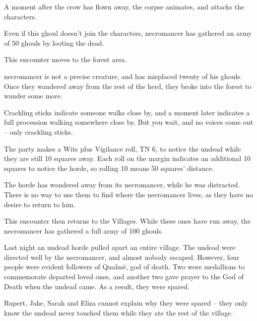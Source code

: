 \begin{multicols}{2}
A moment after the crow has flown away, the corpse animates, and attacks the characters.


Even if this ghoul doesn't join the characters, \gls{necromancer} has gathered an army of 50 ghouls by looting the dead.

This encounter moves to the forest area.


\Gls{necromancer} is not a precise creature, and has misplaced twenty of his ghouls.
Once they wandered away from the rest of the herd, they broke into the forest to wander some more.

\begin{boxtext}

	Crackling sticks indicate someone walks close by, and a moment later indicates a full procession walking somewhere close by.
	But you wait, and no voices come out -- only crackling sticks.

\end{boxtext}

The party makes a Wits plus Vigilance roll, TN 6, to notice the undead while they are still 10 squares away.
Each roll on the margin indicates an additional 10 squares to notice the horde, so rolling 10 means 50 squares' distance.

The horde has wandered away from its necromancer, while he was distracted.
There is no way to use them to find where the necromancer lives, as they have no desire to return to him.

This encounter then returns to the Villages.
While these ones have run away, the necromancer has gathered a full army of 100 ghouls.


Last night an undead horde pulled apart an entire village.  The undead were directed well by the necromancer, and almost nobody escaped.
However, four people were evident followers of Qualm\"{e}, god of death.
Two wore medallions to commemorate departed loved ones, and another two gave prayer to the God of Death when the undead came.
As a result, they were spared.

Rupert, Jake, Sarah and Eliza cannot explain why they were spared -- they only know the undead never touched them while they ate the rest of the village.


\end{multicols}

